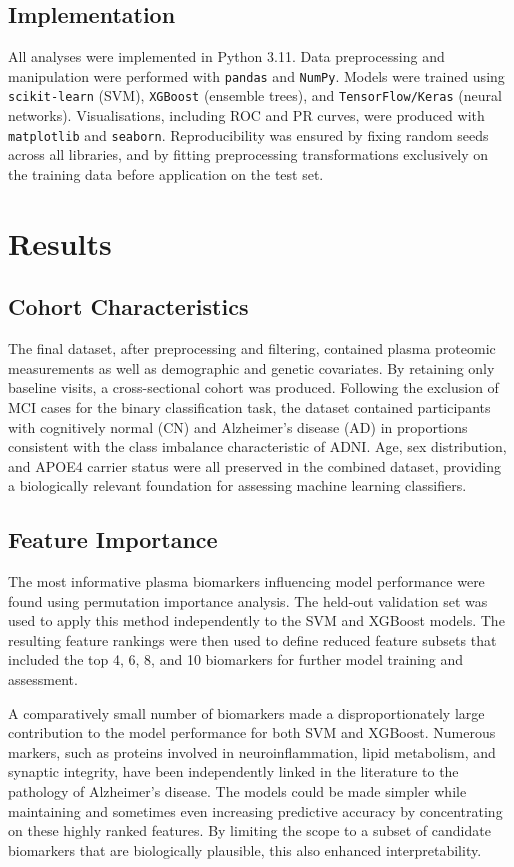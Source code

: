 \documentclass[a4paper,12pt]{article}
\begin{document}
\subsection{Implementation}
All analyses were implemented in Python 3.11. Data preprocessing and manipulation were performed with \texttt{pandas} and \texttt{NumPy}. Models were trained using \texttt{scikit-learn} (SVM), \texttt{XGBoost} (ensemble trees), and \texttt{TensorFlow/Keras} (neural networks). Visualisations, including ROC and PR curves, were produced with \texttt{matplotlib} and \texttt{seaborn}. Reproducibility was ensured by fixing random seeds across all libraries, and by fitting preprocessing transformations exclusively on the training data before application on the test set.  

\newpage
\section{Results}

\subsection{Cohort Characteristics}
The final dataset, after preprocessing and filtering, contained plasma proteomic measurements as well as demographic and genetic covariates. By retaining only baseline visits, a cross-sectional cohort was produced. Following the exclusion of MCI cases for the binary classification task, the dataset contained participants with cognitively normal (CN) and Alzheimer's disease (AD) in proportions consistent with the class imbalance characteristic of ADNI. Age, sex distribution, and APOE4 carrier status were all preserved in the combined dataset, providing a biologically relevant foundation for assessing machine learning classifiers.

\subsection{Feature Importance}
The most informative plasma biomarkers influencing model performance were found using permutation importance analysis.  The held-out validation set was used to apply this method independently to the SVM and XGBoost models. The resulting feature rankings were then used to define reduced feature subsets that included the top 4, 6, 8, and 10 biomarkers for further model training and assessment.

A comparatively small number of biomarkers made a disproportionately large contribution to the model performance for both SVM and XGBoost.  Numerous markers, such as proteins involved in neuroinflammation, lipid metabolism, and synaptic integrity, have been independently linked in the literature to the pathology of Alzheimer's disease.  The models could be made simpler while maintaining and sometimes even increasing predictive accuracy by concentrating on these highly ranked features.  By limiting the scope to a subset of candidate biomarkers that are biologically plausible, this also enhanced interpretability.
\end{document}
